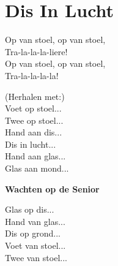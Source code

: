 \section{Dis In Lucht}
Op van stoel, op van stoel,\\
Tra-la-la-la-liere!\\
Op van stoel, op van stoel,\\
Tra-la-la-la-la!

(Herhalen met:)\\
Voet op stoel...\\
Twee op stoel...\\
Hand aan dis...\\
Dis in lucht...\\
Hand aan glas...\\
Glas aan mond...

\textbf{Wachten op de Senior}

Glas op dis...\\
Hand van glas...\\
Dis op grond...\\
Voet van stoel...\\
Twee van stoel...

